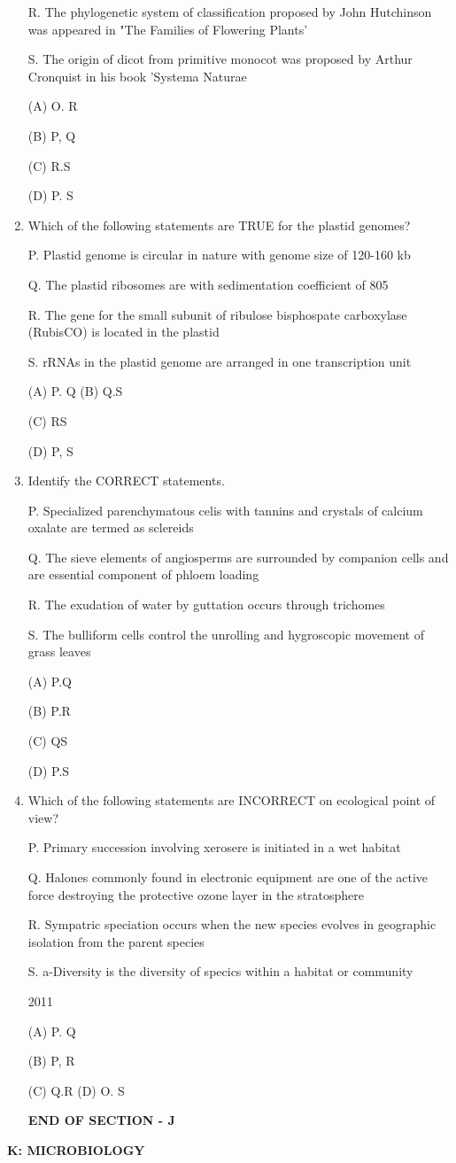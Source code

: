 \documentclass[journal]{IEEEtran}
\begin{document}
\begin{enumerate}
{R. The phylogenetic system of classification proposed by John Hutchinson was appeared in "The Families of Flowering Plants'

S. The origin of dicot from primitive monocot was proposed by Arthur Cronquist in his book 'Systema Naturae

(A) O. R

(B) P, Q

(C) R.S

(D) P. S
}
\item{ Which of the following statements are TRUE for the plastid genomes?

P. Plastid genome is circular in nature with genome size of 120-160 kb

Q. The plastid ribosomes are with sedimentation coefficient of 805

R. The gene for the small subunit of ribulose bisphospate carboxylase (RubisCO) is located in the plastid

S. rRNAs in the plastid genome are arranged in one transcription unit

(A) P. Q
(B) Q.S

(C) RS

(D) P, S
}
\item {Identify the CORRECT statements.


P. Specialized parenchymatous celis with tannins and crystals of calcium oxalate are termed as sclereids

Q. The sieve elements of angiosperms are surrounded by companion cells and are essential component of phloem loading

R. The exudation of water by guttation occurs through trichomes

S. The bulliform cells control the unrolling and hygroscopic movement of grass leaves

(A) P.Q

(B) P.R

(C) QS

(D) P.S
}
\item {Which of the following statements are INCORRECT on ecological point of view?

P. Primary succession involving xerosere is initiated in a wet habitat

Q. Halones commonly found in electronic equipment are one of the active force destroying the protective ozone layer in the stratosphere

R. Sympatric speciation occurs when the new species evolves in geographic isolation from the parent species

S. a-Diversity is the diversity of specics within a habitat or community

2011

(A) P. Q

(B) P, R

(C) Q.R
(D) O. S
}
\newline\textbf{END OF SECTION - J}
\end{enumerate}
\newpage
\textbf{K: MICROBIOLOGY}
\end{document}
